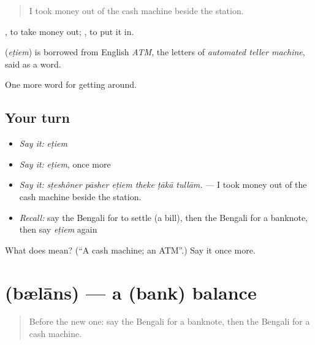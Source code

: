 \begin{quote}
I took money out of the cash machine beside the station.
\end{quote}

 , to take money out;   , to put it in.

\begin{cousinweb}
\textbf{} (\emph{eṭiem}) is borrowed from English \emph{ATM}, the letters of \emph{automated teller machine}, said as a word.
\end{cousinweb}

\begin{grammarlens}[title={What you've built}]
One more word for getting around.
\end{grammarlens}

\subsection*{Your turn}
\begin{itemize}
\raggedright
  \item \emph{Say it:} \emph{eṭiem}
  \item \emph{Say it:} \emph{eṭiem}, once more
  \item \emph{Say it:} \emph{sṭeshôner pāsher eṭiem theke ṭākā tullām.} — I took money out of the cash machine beside the station.
  \item \emph{Recall:} say the Bengali for to settle (a bill), then the Bengali for a banknote, then say \emph{eṭiem} again
\end{itemize}

\begin{tcolorbox}[breakable,colback=teal!4,colframe=teal!35!black,title={Before you move on}]
What does  mean? (\textquotedblleft{}A cash machine; an ATM\textquotedblright{}.) Say it once more.
\end{tcolorbox}
\section[\texorpdfstring{\bn{ব্যালান্স} (bælāns)}{ব্যালান্স (bælāns)}]{ (bælāns) — a (bank) balance}

\label{lesson:BN-C417-belans}



\begin{quote}
Before the new one: say the Bengali for a banknote, then the Bengali for a cash machine.
\end{quote}

